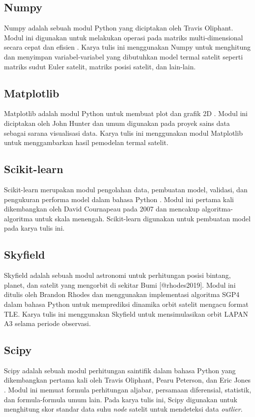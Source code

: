 \subsection{Numpy}

Numpy adalah sebuah modul Python yang diciptakan oleh Travis Oliphant. Modul
ini digunakan untuk melakukan operasi pada matriks multi-dimensional secara
cepat dan efisien \cite{harris2020}. Karya tulis ini menggunakan Numpy untuk
menghitung dan menyimpan variabel-variabel yang dibutuhkan model termal satelit
seperti matriks sudut Euler satelit, matriks posisi satelit, dan lain-lain. 

\subsection{Matplotlib}

Matplotlib adalah modul Python untuk membuat plot dan grafik 2D \cite{hunter2007}.
Modul ini diciptakan oleh John Hunter dan umum digunakan pada proyek sains data
sebagai sarana visualisasi data. Karya tulis ini menggunakan modul Matplotlib
untuk menggambarkan hasil pemodelan termal satelit.

\subsection{Scikit-learn}

Scikit-learn merupakan modul pengolahan data, pembuatan model, validasi, dan
pengukuran performa model  dalam bahasa Python \cite{pedregosa2011}.
Modul ini pertama kali dikembangkan oleh David Cournapeau pada 2007 dan
mencakup algoritma-algoritma  untuk skala menengah.
Scikit-learn digunakan untuk pembuatan model  pada karya tulis
ini.

\subsection{Skyfield}

Skyfield adalah sebuah modul astronomi untuk perhitungan posisi bintang,
planet, dan satelit yang mengorbit di sekitar Bumi [@rhodes2019]. Modul ini
ditulis oleh Brandon Rhodes dan menggunakan implementasi algoritma SGP4 dalam
bahasa Python \cite{rodriguez} untuk memprediksi dinamika orbit satelit mengacu
format TLE. Karya tulis ini menggunakan Skyfield untuk
mensimulasikan orbit LAPAN A3 selama periode observasi.

\subsection{Scipy}

Scipy adalah sebuah modul perhitungan saintifik dalam bahasa Python yang
dikembangkan pertama kali oleh Travis Oliphant, Pearu Peterson, dan Eric Jones
\cite{virtanen2020}. Modul ini memuat formula perhitungan aljabar, persamaan
diferensial, statistik, dan formula-formula umum lain. Pada karya tulis ini,
Scipy digunakan untuk menghitung skor standar data suhu \textit{node} satelit
untuk mendeteksi data \textit{outlier}.
